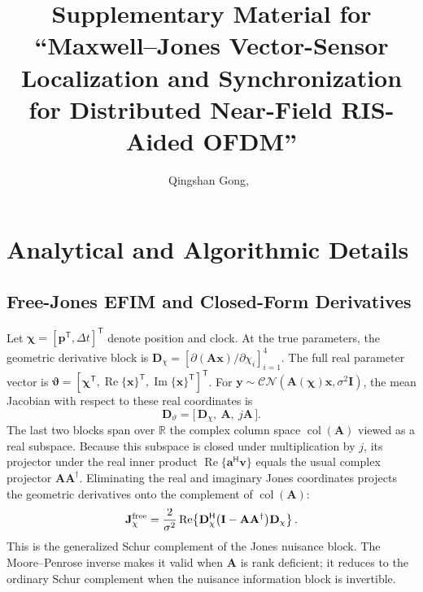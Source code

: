 \documentclass[journal,letterpaper]{IEEEtran}
\newcommand{\R}{\mathbb{R}}
\newcommand{\bx}{\mathbf{x}}
\newcommand{\by}{\mathbf{y}}
\newcommand{\ba}{\mathbf{a}}
\newcommand{\bp}{\mathbf{p}}
\newcommand{\bv}{\mathbf{v}}
\newcommand{\bA}{\mathbf{A}}
\newcommand{\bD}{\mathbf{D}}
\newcommand{\bI}{\mathbf{I}}
\newcommand{\bJ}{\mathbf{J}}
\newcommand{\bchi}{\boldsymbol{\chi}}
\newcommand{\bvt}{\boldsymbol{\vartheta}}
\newcommand{\Real}{\operatorname{Re}}
\newcommand{\coll}{\operatorname{col}}
\begin{document}
\title{Supplementary Material for ``Maxwell--Jones Vector-Sensor
Localization and Synchronization for Distributed Near-Field RIS-Aided
OFDM''}

\author{Qingshan Gong,~}


\maketitle
\raggedbottom
\makeatletter
\def\ps@supplementary{%
  \def\@oddhead{\hbox{}\normalfont\scriptsize
    SUPPLEMENTARY MATERIAL: MKSC-GI-INITIALIZED CCOP-JVP\hfil\thepage}%
  \let\@evenhead\@oddhead
  \let\@oddfoot\@empty
  \let\@evenfoot\@empty}
\let\ps@plain\ps@supplementary
\pagestyle{supplementary}
\makeatother

\section{Analytical and Algorithmic Details}

\subsection{Free-Jones EFIM and Closed-Form Derivatives}

Let $\bchi=[\bp^{\mathsf T},\Delta t]^{\mathsf T}$ denote position and
clock.  At the true parameters, the geometric derivative block is
$\bD_\chi=[\partial(\bA\bx)/\partial\chi_i]_{i=1}^{4}$.  The full real
parameter vector is
$\bvt=[\bchi^{\mathsf T},\Real\{\bx\}^{\mathsf T},
\operatorname{Im}\{\bx\}^{\mathsf T}]^{\mathsf T}$.  For
$\by\sim\mathcal{CN}(\bA(\bchi)\bx,\sigma^2\bI)$, the mean Jacobian with
respect to these real coordinates is
\begin{equation}
 \bD_{\vartheta}=\big[\,\bD_\chi,\ \bA,\ j\bA\,\big].
 \label{eq:s_efim_jac}
\end{equation}
The last two blocks span over $\R$ the complex column space
$\coll(\bA)$ viewed as a real subspace.  Because this subspace is closed
under multiplication by $j$, its projector under the real inner product
$\Real\{\ba^{\mathsf H}\bv\}$ equals the usual complex projector
$\bA\bA^\dagger$.  Eliminating the real and imaginary Jones coordinates
projects the geometric derivatives onto the complement of $\coll(\bA)$:
\begin{equation}
 \bJ_\chi^{\rm free}
 =\frac{2}{\sigma^2}\Real\!\left\{\bD_\chi^{\mathsf H}
 \big(\bI-\bA\bA^\dagger\big)\bD_\chi\right\}.
 \label{eq:s_efim}
\end{equation}
This is the generalized Schur complement of the Jones nuisance block.  The
Moore--Penrose inverse makes it valid when $\bA$ is rank deficient; it reduces
to the ordinary Schur complement when the nuisance information block is
invertible.
\end{document}
